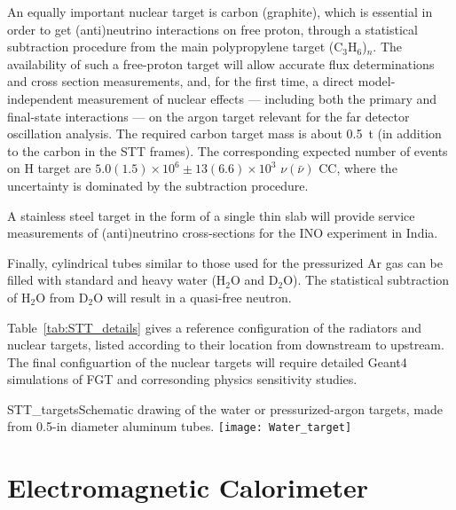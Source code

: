 An equally important nuclear target is carbon (graphite), which is
essential in order to get (anti)neutrino interactions on free proton,
through a statistical subtraction procedure from the main
polypropylene target (C$_3$H$_6$)$_n$.  The availability of such a
free-proton target will allow accurate flux determinations and cross
section measurements, and, for the first time, a direct
model-independent measurement of nuclear effects --- including both
the primary and final-state interactions --- on the argon target
relevant for the far detector oscillation analysis. The required
carbon target mass is about 0.5~t (in addition to the carbon in the
STT frames). The corresponding expected number of events on H target
are $5.0 (1.5) \times 10^6 \pm 13(6.6) \times 10^3$ $\nu(\bar \nu)$
CC, where the uncertainty is dominated by the subtraction procedure.

A stainless steel target in the form of a single thin slab will
provide service measurements of (anti)neutrino cross-sections for the
INO experiment in India.

Finally, cylindrical tubes similar to those used for the pressurized Ar gas can
be filled with standard and heavy water (H$_2$O and D$_2$O). The
statistical subtraction of H$_2$O from D$_2$O will result in a
quasi-free neutron.

Table~\ref{tab:STT_details} gives a reference configuration of the
radiators and nuclear targets, listed according to their location from
downstream to upstream.  The final configuartion of the nuclear
targets will require detailed Geant4 simulations of FGT and
corresonding physics sensitivity studies.



\begin{cdrfigure}{STT_targets}{Schematic drawing of the water or pressurized-argon targets, 
made from 0.5-in diameter aluminum tubes.}
\texttt{[image: Water\_target]}
\end{cdrfigure}

\section{Electromagnetic Calorimeter}
\label{sec:nd-nnd-emcalo}

